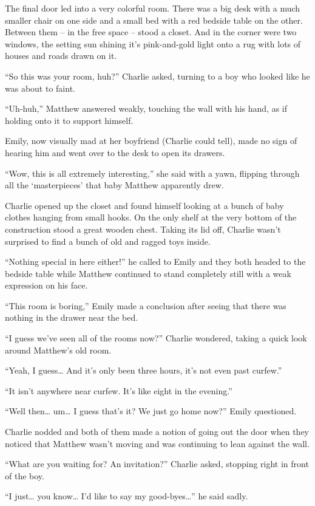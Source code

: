 The final door led into a very colorful room. There was a big desk with a much smaller chair on one side and a small bed with a red bedside table on the other. Between them – in the free space – stood a closet. And in the corner were two windows, the setting sun shining it’s pink-and-gold light onto a rug with lots of houses and roads drawn on it.

“So this was your room, huh?” Charlie asked, turning to a boy who looked like he was about to faint.

“Uh-huh,” Matthew answered weakly, touching the wall with his hand, as if holding onto it to support himself.

Emily, now visually mad at her boyfriend (Charlie could tell), made no sign of hearing him and went over to the desk to open its drawers.

“Wow, this is all extremely interesting,” she said with a yawn, flipping through all the ‘masterpieces’ that baby Matthew apparently drew.

Charlie opened up the closet and found himself looking at a bunch of baby clothes hanging from small hooks. On the only shelf at the very bottom of the construction stood a great wooden chest. Taking its lid off, Charlie wasn’t surprised to find a bunch of old and ragged toys inside.

“Nothing special in here either!” he called to Emily and they both headed to the bedside table while Matthew continued to stand completely still with a weak expression on his face.

“This room is boring,” Emily made a conclusion after seeing that there was nothing in the drawer near the bed.

“I guess we’ve seen all of the rooms now?” Charlie wondered, taking a quick look around Matthew’s old room.

“Yeah, I guess… And it’s only been three hours, it’s not even past curfew.”

“It isn’t anywhere near curfew. It’s like eight in the evening.”

“Well then… um… I guess that’s it? We just go home now?” Emily questioned.

Charlie nodded and both of them made a notion of going out the door when they noticed that Matthew wasn’t moving and was continuing to lean against the wall.

“What are you waiting for? An invitation?” Charlie asked, stopping right in front of the boy.

“I just… you know… I’d like to say my good-byes…” he said sadly.

